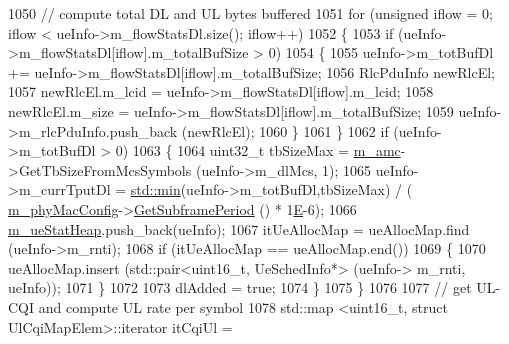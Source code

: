 \begin{DoxyCode}
1050                         \textcolor{comment}{// compute total DL and UL bytes buffered}
1051                         \textcolor{keywordflow}{for} (\textcolor{keywordtype}{unsigned} iflow = 0; iflow < ueInfo->m\_flowStatsDl.size(); iflow++)
1052                         \{
1053                                 \textcolor{keywordflow}{if} (ueInfo->m\_flowStatsDl[iflow].m\_totalBufSize > 0)
1054                                 \{
1055                                         ueInfo->m\_totBufDl += ueInfo->m\_flowStatsDl[iflow].m\_totalBufSize;
1056                                         RlcPduInfo newRlcEl;
1057                                         newRlcEl.m\_lcid = ueInfo->m\_flowStatsDl[iflow].m\_lcid;
1058                                         newRlcEl.m\_size = ueInfo->m\_flowStatsDl[iflow].m\_totalBufSize;
1059                                         ueInfo->m\_rlcPduInfo.push\_back (newRlcEl);
1060                                 \}
1061                         \}
1062                         \textcolor{keywordflow}{if} (ueInfo->m\_totBufDl > 0)
1063                         \{
1064                                 uint32\_t tbSizeMax = \hyperlink{classns3_1_1MmWaveFlexTtiPfMacScheduler_ab9cf29146f4e3094526de08ffe08b193}{m\_amc}->GetTbSizeFromMcsSymbols (ueInfo->m\_dlMcs, 
      1);
1065                                 ueInfo->m\_currTputDl = \hyperlink{80211b_8c_ac6afabdc09a49a433ee19d8a9486056d}{std::min}(ueInfo->m\_totBufDl,tbSizeMax) / (
      \hyperlink{classns3_1_1MmWaveMacScheduler_a24d7af4971d2e500fe543cefbafa2fd9}{m\_phyMacConfig}->\hyperlink{classns3_1_1MmWavePhyMacCommon_a1d402260d29c8931dd3dde73b295e23d}{GetSubframePeriod} () * 1\hyperlink{packet-test-suite_8cc_a171669980e29849aa5e3722d573181ee}{E}-6);
1066                                 \hyperlink{classns3_1_1MmWaveFlexTtiPfMacScheduler_afa463c768b5a2c1447cdf48daa3cf412}{m\_ueStatHeap}.push\_back(ueInfo);
1067                                 itUeAllocMap = ueAllocMap.find (ueInfo->m\_rnti);
1068                                 \textcolor{keywordflow}{if} (itUeAllocMap == ueAllocMap.end())
1069                                 \{
1070                                         ueAllocMap.insert (std::pair<uint16\_t, UeSchedInfo*> (ueInfo->
      m\_rnti, ueInfo));
1071                                 \}
1072 
1073                                 dlAdded = \textcolor{keyword}{true};
1074                         \}
1075                 \}
1076 
1077                 \textcolor{comment}{// get UL-CQI and compute UL rate per symbol}
1078                 std::map <uint16\_t, struct UlCqiMapElem>::iterator itCqiUl = 

\end{DoxyCode}
